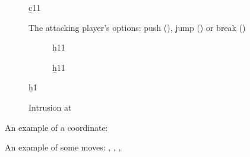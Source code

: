 \begin{figure}[!htb]
\centering
\begin{board}{13}
\b{c11}{\hexRightArrow}
\end{board}
\caption{The attacking player's options: push (), jump () or break ()}
\label{fig:ladder_attack_options}
\end{figure}

\begin{figure}[!htb]
\centering
\begin{subfigure}[b]{0.4\linewidth}
\centering
\begin{board}{13}
\b{h11}{\hexRightArrow}
\end{board}
\end{subfigure}
\begin{subfigure}[b]{0.4\linewidth}
\centering
\begin{board}{13}
\b{h11}{\hexRightArrow}
\end{board}
\end{subfigure}
\caption{}
\label{fig:third_row_switchback}
\end{figure} 

\begin{figure}[!htb]
\centering
\begin{board}{12}
\b{h1}{\hexUpArrow}
\end{board}
\caption{Intrusion at }
\label{fig:template_va_intrusion_a}
\end{figure}

An example of a coordinate: 

An example of some moves: , , , 

 